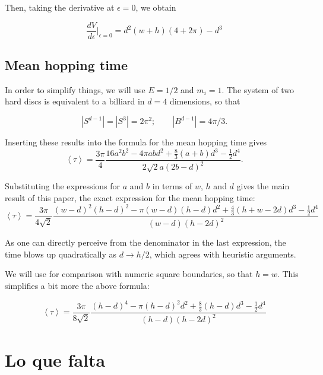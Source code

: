 \documentclass[a4paper,10pt]{article}
\newcommand{\mean}[1]{\left \langle #1 \right \rangle}
\begin{document}
Then, taking the derivative at $\epsilon=0$, we obtain

\begin{equation}\label{Areaepsilon}
 \frac{dV}{d\epsilon} \vert_{\epsilon=0}
= d^2(w+h)(4+2\pi)-d^3
\end{equation}


\subsection{Mean hopping time}

In order to simplify things, we will use $E=1/2$ and $m_i=1$.
The system of two hard discs is equivalent to a billiard in $d=4$ dimensions, so that

\begin{equation}
 |S^{d-1}| = |S^3| = 2 \pi^2; \qquad |B^{d-1}| = 4 \pi / 3.
\end{equation}

Inserting these results into the formula for the mean hopping time gives
\begin{equation}
 \mean{\tau} = 	
\frac{3 \pi}{4}
\frac
{16 a^{2} b^{2}  - 4 \pi a b d^{2} + \textstyle \frac{8}{3} (a+b) d^{3}  - \frac{1}{2} d^{4}}
{ 2 \sqrt{2} a ( 2b - d )^2}.
\end{equation}

Substituting the expressions for $a$ and $b$ in terms of $w$, $h$ and $d$ gives
the main result of this paper, the exact expression for the mean hopping time:
\begin{equation}\label{hoptimegeneral}
 \mean{\tau} = \frac{3 \pi}{4 \sqrt{2}}
\frac{(w-d)^2(h-d)^2-\pi(w-d)(h-d)d^2+\frac{4}{3}(h+w-2d)d^3-\frac{1}{2}d^4}
{(w-d)(h-2d)^2}
\end{equation}

As one can directly perceive from the denominator in the last expression, the
time blows up quadratically as $d\rightarrow h/2$, which agrees
with heuristic arguments. 

We will use for comparison with numeric square boundaries, 
so that $h=w$. This simplifies a bit more the above 
formula:

\begin{equation}\label{hoptimesquare}
 \mean{\tau} =\frac{3\pi}{8\sqrt{2}} 
\frac{(h-d)^4-\pi(h-d)^2d^2+\frac{8}{3}(h-d)d^3-\frac{1}{2}d^4}
{(h-d)(h-2d)^2}
\end{equation}



\section{Lo que falta}
\end{document}
